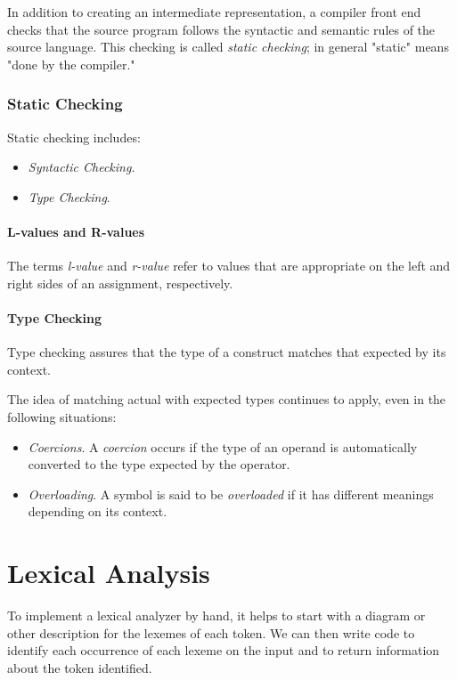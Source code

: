 \documentclass[12pt,a4paper,twoside,openany]{book}
\begin{document}
In addition to creating an intermediate representation, a compiler front end checks that the source program follows the syntactic and semantic rules of the source language. This checking is called \textit{static checking}; in general "static" means "done by  the compiler."

\subsection{Static Checking}

Static checking includes:
\begin{itemize}
    \item\textit{Syntactic Checking}.
    \item\textit{Type Checking}.
\end{itemize}

\subsubsection{L-values and R-values}

The terms \textit{l-value} and \textit{r-value} refer to values that are appropriate on the left and right sides of an assignment, respectively.

\subsubsection{Type Checking}

Type checking assures that the type of a construct matches that expected by its context.

The idea of matching actual with expected types continues to apply, even in the following situations:
\begin{itemize}
    \item\textit{Coercions}. A \textit{coercion} occurs if the type of an operand is automatically converted to the type expected by the operator.
    \item\textit{Overloading}. A symbol is said to be \textit{overloaded} if it has different meanings depending on its context.
\end{itemize}

\chapter{Lexical Analysis}

To implement a lexical analyzer by hand, it helps to start with a diagram or other description for the lexemes of each token. We can then write code to identify each occurrence of each lexeme on the input and to return information about the token identified.
\end{document}
